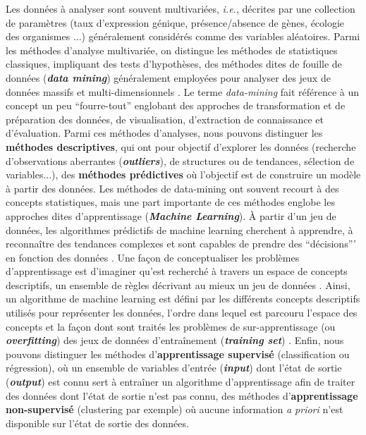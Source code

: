 Les données à analyser sont souvent multivariées, \textit{i.e.}, décrites par une collection de paramètres (taux d'expression génique, présence/absence de gènes, écologie des organismes ...) généralement considérés comme des variables aléatoires. Parmi les méthodes d'analyse multivariée, on distingue les méthodes de statistiques classiques, impliquant des tests d'hypothèses, des méthodes dites de fouille de données (\textit{\textbf{data mining}}) généralement employées pour analyser des jeux de données massifs et multi-dimensionnels \citep{izenman2008modern}. Le terme \textit{data-mining} fait référence à un concept un peu “fourre-tout” englobant des approches de transformation et de préparation des données, de visualisation, d'extraction de connaissance et d'évaluation. Parmi ces méthodes d'analyses, nous pouvons distinguer les \textbf{méthodes descriptives}, qui ont pour objectif d'explorer les données (recherche d'observations aberrantes (\textbf{\textit{outliers}}), de structures ou de tendances, sélection de variables...), des \textbf{méthodes prédictives} où l'objectif est de construire un modèle à partir des données. Les méthodes de data-mining ont souvent recourt à des concepts statistiques, mais une part importante de ces méthodes englobe les approches dites d'apprentissage (\textbf{\textit{Machine Learning}}). À partir d'un jeu de données, les algorithmes prédictifs de machine learning cherchent à apprendre, à reconnaître des tendances complexes et sont capables de prendre des “décisions”' en fonction des données \citep{han2012data}. Une façon de conceptualiser les problèmes d'apprentissage est d'imaginer qu'est recherché à travers un espace de concepts descriptifs, un ensemble de règles décrivant au mieux un jeu de données \citep{witten2013data}. Ainsi, un algorithme de machine learning est défini par les différents concepts descriptifs utilisés pour représenter les données, l'ordre dans lequel est parcouru l'espace des concepts et la façon dont sont traités les problèmes de sur-apprentissage (ou \textbf{\textit{overfitting}}) des jeux de données d’entraînement (\textbf{\textit{training set}}) \citep{witten2013data}. Enfin, nous pouvons distinguer les méthodes d'\textbf{apprentissage supervisé} (classification ou régression), où un ensemble de variables d'entrée (\textbf{\textit{input}}) dont l'état de sortie (\textit{\textbf{output}}) est connu sert à entraîner un algorithme d'apprentissage afin de traiter des données dont l'état de sortie n'est pas connu, des méthodes d'\textbf{apprentissage non-supervisé} (clustering par exemple) où aucune information \textit{a priori} n'est disponible sur l'état de sortie des données. \\
